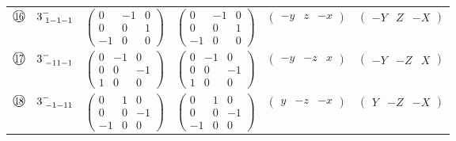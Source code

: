 \documentclass[fleqn,10pt,landscape]{jsarticle}
\begin{document}
\begin{center}
\begin{longtable}{lcccc}
$ {\ooalign{\hfil\resizebox{.8\width}{\height}{16}\hfil\crcr\raise.1ex\hbox{\large$\bigcirc$}}}\quad 3^{-}_{\,\,1-1-1} $ & $ \begin{pmatrix} 0 & -1 & 0 \\ 0 & 0 & 1 \\ -1 & 0 & 0 \end{pmatrix} $ & $ \begin{pmatrix} 0 & -1 & 0 \\ 0 & 0 & 1 \\ -1 & 0 & 0 \end{pmatrix} $ & $ \begin{pmatrix} - y & z & - x \end{pmatrix} $ & $ \begin{pmatrix} - Y & Z & - X \end{pmatrix} $ \\
$ {\ooalign{\hfil\resizebox{.8\width}{\height}{17}\hfil\crcr\raise.1ex\hbox{\large$\bigcirc$}}}\quad 3^{-}_{\,\,-11-1} $ & $ \begin{pmatrix} 0 & -1 & 0 \\ 0 & 0 & -1 \\ 1 & 0 & 0 \end{pmatrix} $ & $ \begin{pmatrix} 0 & -1 & 0 \\ 0 & 0 & -1 \\ 1 & 0 & 0 \end{pmatrix} $ & $ \begin{pmatrix} - y & - z & x \end{pmatrix} $ & $ \begin{pmatrix} - Y & - Z & X \end{pmatrix} $ \\
$ {\ooalign{\hfil\resizebox{.8\width}{\height}{18}\hfil\crcr\raise.1ex\hbox{\large$\bigcirc$}}}\quad 3^{-}_{\,\,-1-11} $ & $ \begin{pmatrix} 0 & 1 & 0 \\ 0 & 0 & -1 \\ -1 & 0 & 0 \end{pmatrix} $ & $ \begin{pmatrix} 0 & 1 & 0 \\ 0 & 0 & -1 \\ -1 & 0 & 0 \end{pmatrix} $ & $ \begin{pmatrix} y & - z & - x \end{pmatrix} $ & $ \begin{pmatrix} Y & - Z & - X \end{pmatrix} $ \\

\end{longtable}
\end{center}
\end{document}
